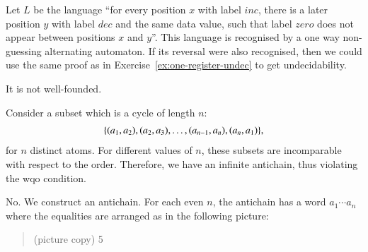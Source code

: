 {
Let $L$ be the language ``for every position $x$ with label $inc$, there is a later position $y$ with label $dec$ and the same data value, such that label $zero$ does not appear between positions $x$ and $y$''. This language is recognised by a one way non-guessing alternating automaton. If its reversal were also recognised, then we could use the same proof as in Exercise~\ref{ex:one-register-undec} to get undecidability. 
}



{
    It is not well-founded.
}



{
    Consider a subset which is a cycle of length $n$: 
    \begin{align*}
    \{(a_1,a_2),(a_2,a_3),\ldots,(a_{n-1},a_n),(a_n,a_1)\},
    \end{align*}
    for $n$ distinct atoms. For different values of $n$, these subsets are incomparable with respect to the order. Therefore, we have an infinite antichain, thus violating the wqo condition.
}

{ 
    No. We construct an antichain. For each even $n$, the antichain has a word  $a_1 \cdots a_n$  where the  equalities are arranged as in the following picture:
    \begin{quotation}
        (picture copy) 5
    \end{quotation}


 }

